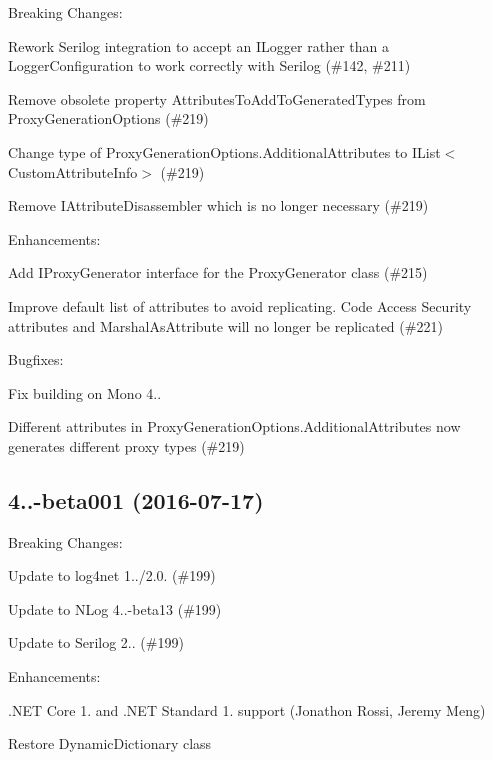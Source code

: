Breaking Changes\+:
\begin{DoxyItemize}
\item Rework Serilog integration to accept an I\+Logger rather than a Logger\+Configuration to work correctly with Serilog (\#142, \#211)
\item Remove obsolete property {\ttfamily Attributes\+To\+Add\+To\+Generated\+Types} from {\ttfamily Proxy\+Generation\+Options} (\#219)
\item Change type of {\ttfamily Proxy\+Generation\+Options.\+Additional\+Attributes} to {\ttfamily I\+List$<$Custom\+Attribute\+Info$>$} (\#219)
\item Remove {\ttfamily I\+Attribute\+Disassembler} which is no longer necessary (\#219)
\end{DoxyItemize}

Enhancements\+:
\begin{DoxyItemize}
\item Add I\+Proxy\+Generator interface for the Proxy\+Generator class (\#215)
\item Improve default list of attributes to avoid replicating. Code Access Security attributes and Marshal\+As\+Attribute will no longer be replicated (\#221)
\end{DoxyItemize}

Bugfixes\+:
\begin{DoxyItemize}
\item Fix building on Mono 4..
\item Different attributes in {\ttfamily Proxy\+Generation\+Options.\+Additional\+Attributes} now generates different proxy types (\#219)
\end{DoxyItemize}

\subsection*{4..-\/beta001 (2016-\/07-\/17)}

Breaking Changes\+:
\begin{DoxyItemize}
\item Update to log4net 1../2.0. (\#199)
\item Update to N\+Log 4..-\/beta13 (\#199)
\item Update to Serilog 2.. (\#199)
\end{DoxyItemize}

Enhancements\+:
\begin{DoxyItemize}
\item .N\+ET Core 1. and .N\+ET Standard 1. support (Jonathon Rossi, Jeremy Meng)
\item Restore Dynamic\+Dictionary class
\end{DoxyItemize}

